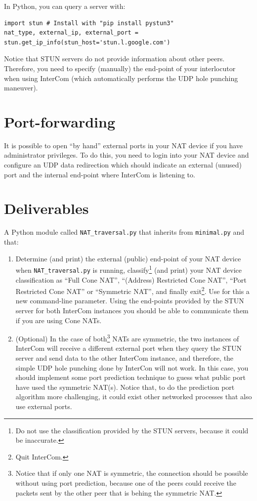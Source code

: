 In Python, you can query a server with:
\begin{verbatim}
import stun # Install with "pip install pystun3"
nat_type, external_ip, external_port = stun.get_ip_info(stun_host='stun.l.google.com')
\end{verbatim}

Notice that STUN servers do not provide information about other
peers. Therefore, you need to specify (manually) the end-point of your
interlocutor when using InterCom (which automatically performs the UDP
hole punching maneuver).

\section{Port-forwarding}

It is possible to open ``by hand'' external ports in your NAT device
if you have administrator privileges. To do this, you need to login
into your NAT device and configure an UDP data redirection which
should indicate an external (unused) port and the internal end-point
where InterCom is listening to.

\section{Deliverables}

A Python module called \texttt{NAT\_traversal.py} that inherits from
\texttt{minimal.py} and that:
\begin{enumerate}
\item Determine (and print) the external (public) end-point of your
  NAT device when \texttt{NAT\_traversal.py} is running,
  classify\footnote{Do not use the classification provided by the STUN
    servers, because it could be inaccurate.} (and print) your NAT
  device classification as ``Full Cone NAT'', ``(Address) Restricted
  Cone NAT'', ``Port Restricted Cone NAT'' or ``Symmetric NAT'', and
  finally exit\footnote{Quit InterCom.}. Use for this a new
  command-line parameter. Using the end-points provided by the STUN
  server for both InterCom instances you should be able to communicate
  them if you are using Cone NATs.
\item (Optional) In the case of both\footnote{Notice that if only one
NAT is symmetric, the connection should be possible without using port
prediction, because one of the peers could receive the packets sent by
the other peer that is behing the symmetric NAT.} NATs are symmetric,
  the two instances of InterCom will receive a different external port
  when they query the STUN server and send data to the other InterCom
  instance, and therefore, the simple UDP hole punching done by
  InterCon will not work. In this case, you should implement some port
  prediction technique to guess what public port have used the
  symmetric NAT(s). Notice that, to do the prediction port algorithm
  more challenging, it could exist other networked processes that also
  use external ports.
\end{enumerate}

